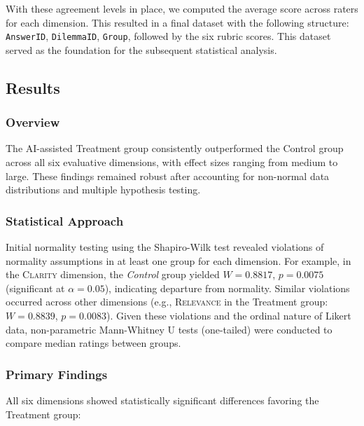 \documentclass[sigconf, authorversion, nonacm, screen]{acmart}
\begin{document}
With these agreement levels in place, we computed the average score across raters for each dimension. This resulted in a final dataset with the following structure: \texttt{AnswerID}, \texttt{DilemmaID}, \texttt{Group}, followed by the six rubric scores. This dataset served as the foundation for the subsequent statistical analysis.


\subsection{Results}

\subsubsection{Overview}

The AI-assisted Treatment group consistently outperformed the Control group across all six evaluative dimensions, with effect sizes ranging from medium to large. These findings remained robust after accounting for non-normal data distributions and multiple hypothesis testing.

\subsubsection{Statistical Approach}

Initial normality testing using the Shapiro-Wilk test revealed violations of normality assumptions in at least one group for each dimension. For example, in the \textsc{Clarity} dimension, the \textit{Control} group yielded $W = 0.8817$, $p = 0.0075$ (significant at $\alpha = 0.05$), indicating departure from normality. Similar violations occurred across other dimensions (e.g., \textsc{Relevance} in the Treatment group: $W = 0.8839$, $p = 0.0083$). Given these violations and the ordinal nature of Likert data, non-parametric Mann-Whitney U tests (one-tailed) were conducted to compare median ratings between groups.

\subsubsection{Primary Findings}

All six dimensions showed statistically significant differences favoring the Treatment group:
\end{document}
